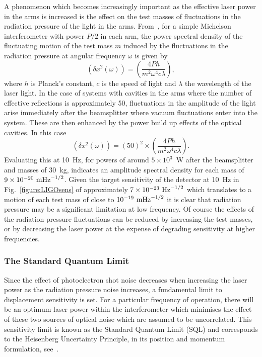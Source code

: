 \documentclass{article}
\begin{document}
A phenomenon which becomes increasingly important as the effective laser power
in the arms is increased is the effect on the test masses of fluctuations in the
radiation pressure of the light in the arms. From~\cite{Edelstein}, for a simple
Michelson interferometer with power $P/2$ in each arm, the power spectral
density of the fluctuating motion of the test mass $m$ induced by the
fluctuations in the radiation pressure at angular frequency $\omega$ is given by
%
\begin{equation}
  (\delta x^2(\omega)) = \left(\frac{4Ph}{m^2 \omega^{4} c
  \lambda}\right),
  \label{equation:radiation1}
\end{equation}
%
where $h$ is Planck's constant, $c$ is the speed of light and $\lambda$ the
wavelength of the laser light. In the case of systems with cavities in the arms
where the number of effective reflections is approximately 50, fluctuations in
the amplitude of the light arise immediately after the beamsplitter where vacuum
fluctuations enter into the system. These are then enhanced by the power build
up effects of the optical cavities. In this case
%
\begin{equation}
  (\delta x^2(\omega)) = (50)^2 \times \left(\frac{4Ph}{m^2 \omega^{4} c
  \lambda}\right).
  \label{equation:radiation2}
\end{equation}
%
Evaluating this at 10~Hz, for powers of around $5 \times 10^3$~W after the
beamsplitter and masses of 30~kg, indicates an amplitude spectral density for
each mass of $9 \times 10^{-20}~{\rm m}{\rm Hz}^{-1/2}$. Given the target
sensitivity of the detector at 10~Hz in Fig.~\ref{figure:LIGOsens} of
approximately $7 \times 10^{-23}~{\rm Hz}^{-1/2}$ which translates to a motion
of each test mass of close to $10^{-19}~{\rm m}{\rm Hz}^{-1/2}$ it is clear
that radiation pressure may be a significant limitation at low frequency. Of
course the effects of the radiation pressure fluctuations can be reduced by
increasing the test masses, or by decreasing the laser power at the expense of
degrading sensitivity at higher frequencies.


\subsubsection{The Standard Quantum Limit}
\label{subsubsection:SQL}

Since the effect of photoelectron shot noise decreases when increasing the laser
power as the radiation pressure noise increases, a fundamental limit to
displacement sensitivity is set. For a particular frequency of operation, there
will be an optimum laser power within the interferometer which minimises the
effect of these two sources of optical noise which are assumed to be
uncorrelated. This sensitivity limit is known as the Standard Quantum Limit
(SQL) and corresponds to the Heisenberg Uncertainty Principle, in its position
and momentum formulation, see~\cite{Edelstein, Caves1, Caves2, Loudon:1981}.
\end{document}

